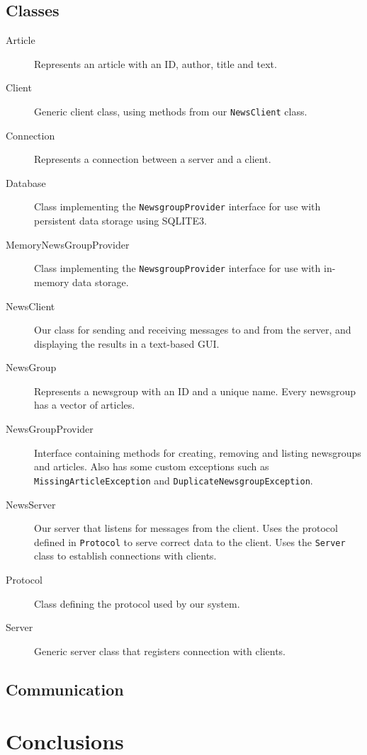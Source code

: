 \documentclass[12pt]{article}
\begin{document}
\subsection{Classes}
\begin{description}
\item[Article] Represents an article with an ID, author, title and text.
\item[Client] Generic client class, using methods from our \verb!NewsClient! class.
\item[Connection] Represents a connection between a server and a client.
\item[Database] Class implementing the \verb!NewsgroupProvider! interface for use with persistent data storage using SQLITE3.
\item[MemoryNewsGroupProvider] Class implementing the \verb!NewsgroupProvider! interface for use with in-memory data storage.
\item[NewsClient] Our class for sending and receiving messages to and from the server, and displaying the results in a text-based GUI. 
\item[NewsGroup] Represents a newsgroup with an ID and a unique name. Every newsgroup has a vector of articles.
\item[NewsGroupProvider] Interface containing methods for creating, removing and listing newsgroups and articles. Also has some custom exceptions such as \verb!MissingArticleException! and \verb!DuplicateNewsgroupException!.
\item[NewsServer] Our server that listens for messages from the client. Uses the protocol defined in \verb!Protocol! to serve correct data to the client. Uses the \verb!Server! class to establish connections with clients.
\item[Protocol] Class defining the protocol used by our system.
\item[Server] Generic server class that registers connection with clients.
\end{description}
\subsection{Communication}

\section{Conclusions}
\end{document}
